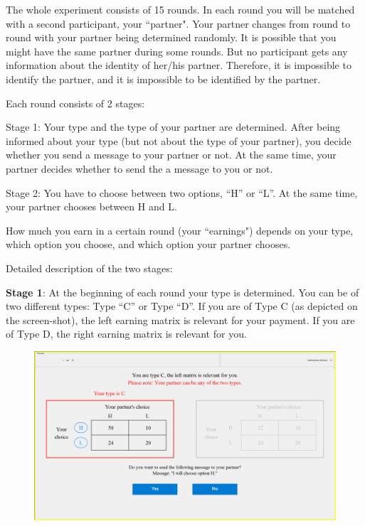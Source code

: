 \documentclass[12pt]{article}
\theoremstyle{break}
\begin{document}
The whole experiment consists of 15 rounds. In each round you will be matched with a second participant, your ``partner". Your partner changes from round to round with your partner being determined randomly. It is possible that you might have the same partner during some rounds. But no participant gets any information about the identity of her/his partner. Therefore, it is impossible to identify the partner, and it is impossible to be identified by the partner.

Each round consists of 2 stages:

Stage 1: Your type and the type of your partner are determined. After being informed about your type (but not about the type of your partner), you decide whether you send a message to your partner or not. At the same time, your partner decides whether to send the a message to you or not.

Stage 2: You have to choose between two options, “H” or “L”. At the same time, your partner chooses between H and L. 

How much you earn in a certain round (your ``earnings") depends on your type, which option you choose, and which option your partner chooses. 

Detailed description of the two stages: 

\textbf{Stage 1}: At the beginning of each round your type is determined. You can be of two different types: Type “C” or Type “D”. If you are of Type C (as depicted on the screen-shot), the left earning matrix is relevant for your payment. If you are of Type D, the right earning matrix is relevant for you. 

\begin{figure}[h]
  \centering
    \includegraphics[width=.9\textwidth]{fig1-CT-instructions.png}
  \label{fig:fig1-CT-instructions}
\end{figure}
\end{document}
